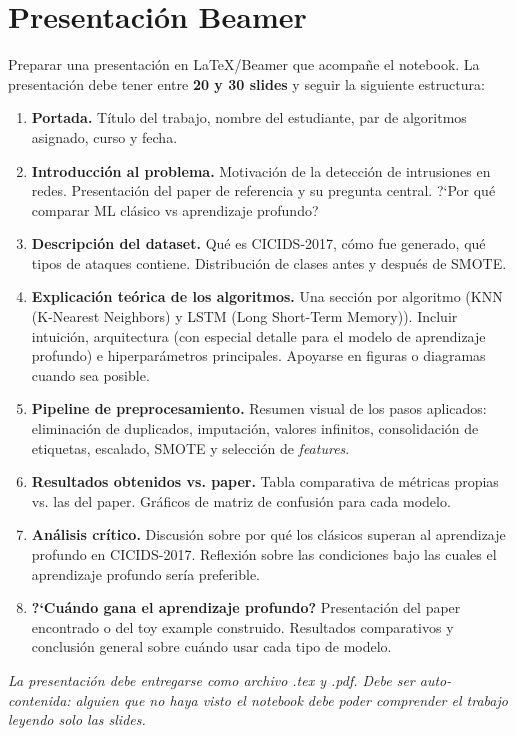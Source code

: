 \documentclass[11pt,a4paper]{article}
\begin{document}
\section{Presentaci\'on Beamer}
Preparar una presentaci\'on en LaTeX/Beamer que acompa\~ne el notebook. La presentaci\'on debe tener entre \textbf{20 y 30 slides} y seguir la siguiente estructura:
\begin{enumerate}[leftmargin=2em,itemsep=3pt]
    \item \textbf{Portada.} T\'itulo del trabajo, nombre del estudiante, par de algoritmos asignado, curso y fecha.
    \item \textbf{Introducci\'on al problema.} Motivaci\'on de la detecci\'on de intrusiones en redes. Presentaci\'on del paper de referencia y su pregunta central. ?`Por qu\'e comparar ML cl\'asico vs aprendizaje profundo?
    \item \textbf{Descripci\'on del dataset.} Qu\'e es CICIDS-2017, c\'omo fue generado, qu\'e tipos de ataques contiene. Distribuci\'on de clases antes y despu\'es de SMOTE.
    \item \textbf{Explicaci\'on te\'orica de los algoritmos.} Una secci\'on por algoritmo (KNN (K-Nearest Neighbors) y LSTM (Long Short-Term Memory)). Incluir intuici\'on, arquitectura (con especial detalle para el modelo de aprendizaje profundo) e hiperpar\'ametros principales. Apoyarse en figuras o diagramas cuando sea posible.
    \item \textbf{Pipeline de preprocesamiento.} Resumen visual de los pasos aplicados: eliminaci\'on de duplicados, imputaci\'on, valores infinitos, consolidaci\'on de etiquetas, escalado, SMOTE y selecci\'on de \textit{features}.
    \item \textbf{Resultados obtenidos vs. paper.} Tabla comparativa de m\'etricas propias vs. las del paper. Gr\'aficos de matriz de confusi\'on para cada modelo.
    \item \textbf{An\'alisis cr\'itico.} Discusi\'on sobre por qu\'e los cl\'asicos superan al aprendizaje profundo en CICIDS-2017. Reflexi\'on sobre las condiciones bajo las cuales el aprendizaje profundo ser\'ia preferible.
    \item \textbf{?`Cu\'ando gana el aprendizaje profundo?} Presentaci\'on del paper encontrado o del toy example construido. Resultados comparativos y conclusi\'on general sobre cu\'ando usar cada tipo de modelo.
\end{enumerate}
\textit{La presentaci\'on debe entregarse como archivo .tex y .pdf. Debe ser auto-contenida: alguien que no haya visto el notebook debe poder comprender el trabajo leyendo solo las slides.}
\end{document}
